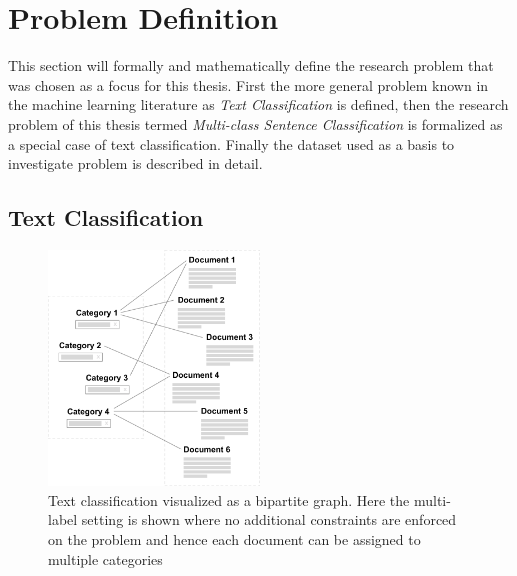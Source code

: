 
\clearpage

\section{Problem Definition}
\label{sec:Problem Definition}

This section will formally and mathematically define the research problem that was chosen as a focus for this thesis. First the more general problem known in the machine learning literature as \emph{Text Classification} is defined, then the research problem of this thesis termed \emph{Multi-class Sentence Classification} is formalized as a special case of text classification. Finally the dataset used as a basis to investigate problem is described in detail.

\subsection{Text Classification}
\label{subs:Text Classification}

\begin{figure}
  \begin{center}
    \includegraphics[width=0.5\textwidth]{img/bipartite-graph-text-classification}
  \end{center}
  \caption{Text classification visualized as a bipartite graph. Here the multi-label setting is shown where no additional constraints are enforced on the problem and hence each document can be assigned to multiple categories}
\label{fig:bipartite-graph-text-classification}
\end{figure}

